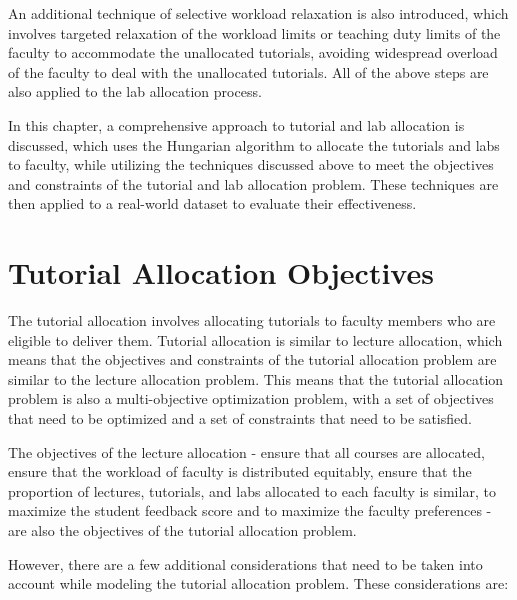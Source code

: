 An additional technique of selective workload relaxation is also introduced, which involves targeted relaxation of the workload limits or teaching duty limits of the faculty to accommodate the unallocated tutorials, avoiding widespread overload of the faculty to deal with the unallocated tutorials. All of the above steps are also applied to the lab allocation process.

In this chapter, a comprehensive approach to tutorial and lab allocation is discussed, which uses the Hungarian algorithm to allocate the tutorials and labs to faculty, while utilizing the techniques discussed above to meet the objectives and constraints of the tutorial and lab allocation problem. These techniques are then applied to a real-world dataset to evaluate their effectiveness.


\section{Tutorial Allocation Objectives}

The tutorial allocation involves allocating tutorials to faculty members who are eligible to deliver them. Tutorial allocation is similar to lecture allocation, which means that the objectives and constraints of the tutorial allocation problem are similar to the lecture allocation problem. This means that the tutorial allocation problem is also a multi-objective optimization problem, with a set of objectives that need to be optimized and a set of constraints that need to be satisfied.

The objectives of the lecture allocation - ensure that all courses are allocated, ensure that the workload of faculty is distributed equitably, ensure that the proportion of lectures, tutorials, and labs allocated to each faculty is similar, to maximize the student feedback score and to maximize the faculty preferences - are also the objectives of the tutorial allocation problem.

However, there are a few additional considerations that need to be taken into account while modeling the tutorial allocation problem. These considerations are:

